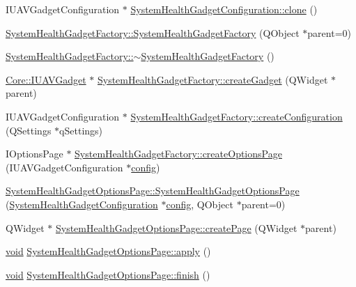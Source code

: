 \begin{DoxyCompactItemize}
\item 
I\-U\-A\-V\-Gadget\-Configuration $\ast$ \hyperlink{group___system_health_plugin_gaec4d54c2f539b5bbead55affc7dd496c}{System\-Health\-Gadget\-Configuration\-::clone} ()
\item 
\hyperlink{group___system_health_plugin_gaf19ba5915588fac5dd9f368210271115}{System\-Health\-Gadget\-Factory\-::\-System\-Health\-Gadget\-Factory} (Q\-Object $\ast$parent=0)
\item 
\hyperlink{group___system_health_plugin_ga6d9272ee992e8241b7a4483dce8ff330}{System\-Health\-Gadget\-Factory\-::$\sim$\-System\-Health\-Gadget\-Factory} ()
\item 
\hyperlink{class_core_1_1_i_u_a_v_gadget}{Core\-::\-I\-U\-A\-V\-Gadget} $\ast$ \hyperlink{group___system_health_plugin_ga042cc7fba53df83dbb7e06626f2b1006}{System\-Health\-Gadget\-Factory\-::create\-Gadget} (Q\-Widget $\ast$parent)
\item 
I\-U\-A\-V\-Gadget\-Configuration $\ast$ \hyperlink{group___system_health_plugin_ga569580fcea35d0f1f9433378dd734624}{System\-Health\-Gadget\-Factory\-::create\-Configuration} (Q\-Settings $\ast$q\-Settings)
\item 
I\-Options\-Page $\ast$ \hyperlink{group___system_health_plugin_gaae1b2e7613b4024f309fd5480fcbe028}{System\-Health\-Gadget\-Factory\-::create\-Options\-Page} (I\-U\-A\-V\-Gadget\-Configuration $\ast$\hyperlink{deflate_8c_a4473b5227787415097004fd39f55185e}{config})
\item 
\hyperlink{group___system_health_plugin_gaa498d06c1c8158466c564b455b1044dc}{System\-Health\-Gadget\-Options\-Page\-::\-System\-Health\-Gadget\-Options\-Page} (\hyperlink{class_system_health_gadget_configuration}{System\-Health\-Gadget\-Configuration} $\ast$\hyperlink{deflate_8c_a4473b5227787415097004fd39f55185e}{config}, Q\-Object $\ast$parent=0)
\item 
Q\-Widget $\ast$ \hyperlink{group___system_health_plugin_ga6ac5a910e1fb73f88186c7602a7425b0}{System\-Health\-Gadget\-Options\-Page\-::create\-Page} (Q\-Widget $\ast$parent)
\item 
\hyperlink{group___u_a_v_objects_plugin_ga444cf2ff3f0ecbe028adce838d373f5c}{void} \hyperlink{group___system_health_plugin_gaff59ee5d1057c119bc98e72b972cdc77}{System\-Health\-Gadget\-Options\-Page\-::apply} ()
\item 
\hyperlink{group___u_a_v_objects_plugin_ga444cf2ff3f0ecbe028adce838d373f5c}{void} \hyperlink{group___system_health_plugin_gabcd1e79513ea408e8c9c6ab98baf6d7f}{System\-Health\-Gadget\-Options\-Page\-::finish} ()

\end{DoxyCompactItemize}
